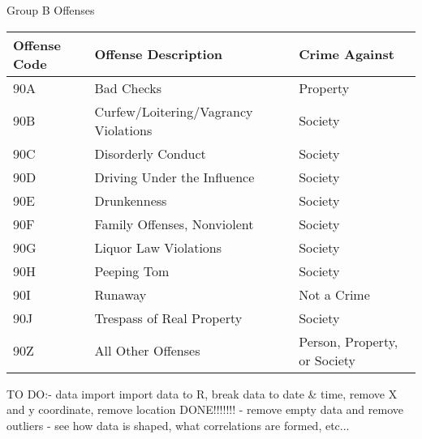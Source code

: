 Group B Offenses
\begin{longtable}{|m{8em} m{16em} m{7em}|}
    \hline
    Offense Code & 
    Offense Description & 
    Crime Against\\
    \hline
    90A & 
    Bad Checks & 
    Property\\
    \hline
    90B & 
    Curfew/Loitering/Vagrancy Violations & 
    Society\\
    \hline
    90C & 
    Disorderly Conduct & 
    Society\\
    \hline
    90D & 
    Driving Under the Influence & 
    Society\\
    \hline
    90E & 
    Drunkenness & 
    Society\\
    \hline
    90F & 
    Family Offenses, Nonviolent & 
    Society\\
    \hline
    90G & 
    Liquor Law Violations & 
    Society\\
    \hline
    90H & 
    Peeping Tom & 
    Society\\
    \hline
    90I & 
    Runaway & 
    Not a Crime\\
    \hline
    90J & 
    Trespass of Real Property & 
    Society\\
    \hline
    90Z & 
    All Other Offenses & 
    Person, Property, or Society\\
    \hline
\end{longtable}


TO DO:- data import \newline
import data to R, break data to date \& time, remove X and y coordinate, remove location\newline
DONE!!!!!!! - remove empty data and remove outliers - see how data is shaped, what correlations are formed, etc... \newline